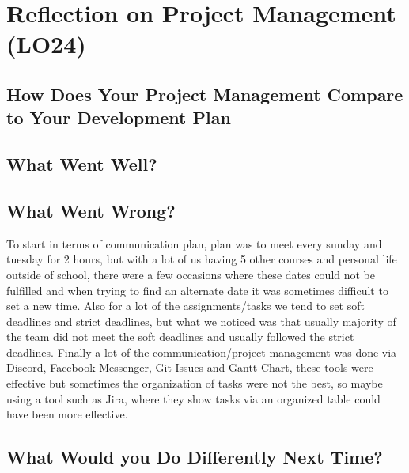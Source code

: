\documentclass{article}
\begin{document}
\section{Reflection on Project Management (LO24)}


\subsection{How Does Your Project Management Compare to Your Development Plan}


\subsection{What Went Well?}


\subsection{What Went Wrong?}

To start in terms of communication plan, plan was to meet every sunday and tuesday for 2 hours, but with a lot of us having 5 other courses and personal life outside of school, there were a few occasions where these dates could not be fulfilled and when trying to find an alternate date it was sometimes difficult to set a new time. Also for a lot of the assignments/tasks we tend to set soft deadlines and strict deadlines, but what we noticed was that usually majority of the team did not meet the soft deadlines and usually followed the strict deadlines. Finally a lot of the communication/project management was done via Discord, Facebook Messenger, Git Issues and Gantt Chart, these tools were effective but sometimes the organization of tasks were not the best, so maybe using a tool such as Jira, where they show tasks via an organized table could have been more effective.

\subsection{What Would you Do Differently Next Time?}
\end{document}
